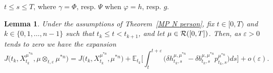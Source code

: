\documentclass[12pt]{article}
\newtheorem{lemma}[prop]{Lemma}
\theoremstyle{named}
\numberwithin{equation}{section}
\begin{document}
$t \leq s \leq T$,
 where $\gamma = \Phi$, resp. $\Psi$ when $\varphi = h$, resp. $g$.
\begin{lemma}
  \label{l1.1}
  Under the assumptions of Theorem~\ref{MP N person},
  fix $t \in [0,T)$ and $k \in \{0, 1, \dots, {n}-1\}$ such that $t_k \leq t < t_{k+1}$,
    and let $\mu \in {\cal R}([0,T])$.
   Then, as $\varepsilon > 0$ tends to zero we have the expansion
\begin{equation}
\nonumber
J\big(t_k ,X^{\mu^{*n} }_{t_k },
 \mu \otimes_{t,\varepsilon} \mu^{*n} \big) = J\big(t_k ,X^{\mu^{*n} }_{t_k }, \mu^{*n} \big)
+ \mathbb{E}_{t_k } \biggl[
  \int_t^{t+\varepsilon } \big(\delta h^{\mu,\mu^{*n} }_{t_k ,s} - \delta b^{\mu,\mu^{*n} }_{t_k ,s} p^{\mu^{*n} }_{t_k ,s}\big)
    ds\biggr] + o(\varepsilon).
\end{equation}
\end{lemma}
\end{document}
